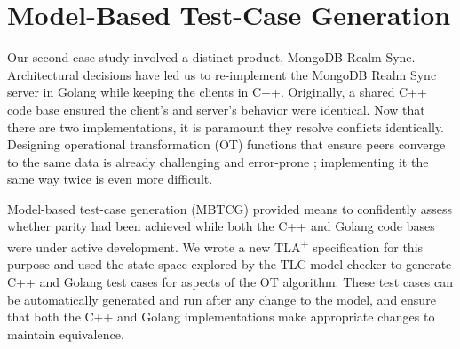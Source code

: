 \documentclass{vldb}
\begin{document}



\section{Model-Based Test-Case Generation}
\label{sec:model_based_test_case_generation}

Our second case study involved a distinct product, MongoDB Realm Sync.
Architectural decisions have led us to re-implement the MongoDB Realm Sync server in Golang while keeping the clients in C++. Originally, a shared C++ code base ensured the client's and server's behavior were identical. Now that there are two implementations, it is paramount they resolve conflicts identically. Designing operational transformation (OT) functions that ensure peers converge to the same data is already challenging and error-prone \cite{Imine03ProvingCorrectnessOfTransformationFunctions, Imine06FormalDesignAndVerificationOfOT, Randolph13OnConsistencyofOTApproach}; implementing it the same way twice is even more difficult.

Model-based test-case generation (MBTCG) \cite{Gravell11ConcurrentDevelopmentOfModelAndImplementation} provided means to confidently assess whether parity had been achieved while both the C++ and Golang code bases were under active development. We wrote a new TLA\textsuperscript{+} specification for this purpose and used the state space explored by the TLC model checker to generate C++ and Golang test cases for aspects of the OT algorithm. These test cases can be automatically generated and run after any change to the model, and ensure that both the C++ and Golang implementations make appropriate changes to maintain equivalence.
\end{document}
